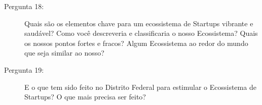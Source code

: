 \begin{apendicesenv}
\begin{description}
  
  \item [Pergunta 18:] Quais são os elementos chave para um ecossistema de Startups vibrante e saudável? Como você descreveria e classificaria o nosso Ecossistema? Quais os nossos pontos fortes e fracos? Algum Ecossistema ao redor do mundo que seja similar ao nosso?

  \item [Pergunta 19:] E o que tem sido feito no Distrito Federal para estimular o Ecossistema de Startups? O que mais precisa ser feito?
\end{description}


\end{apendicesenv}
